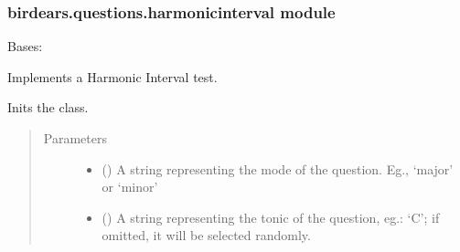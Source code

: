 \documentclass[letterpaper,10pt,english]{sphinxmanual}
\begin{document}
\subsubsection{birdears.questions.harmonicinterval module}
\label{\detokenize{birdears.questions:module-birdears.questions.harmonicinterval}}\label{\detokenize{birdears.questions:birdears-questions-harmonicinterval-module}}

\begin{fulllineitems}
\label{\detokenize{birdears.questions:birdears.questions.harmonicinterval.HarmonicIntervalQuestion}}
Bases: {\hyperref[\detokenize{index:birdears.questionbase.QuestionBase}]{}}

Implements a Harmonic Interval test.

\begin{fulllineitems}
\label{\detokenize{birdears.questions:birdears.questions.harmonicinterval.HarmonicIntervalQuestion.__init__}}
Inits the class.
\begin{quote}\begin{description}
\item[{Parameters}] \leavevmode\begin{itemize}
\item {} 
 () \textendash{} A string representing the mode of the question.
Eg., ‘major’ or ‘minor’

\item {} 
 () \textendash{} A string representing the tonic of the question,
eg.: ‘C’; if omitted, it will be selected randomly.


\end{itemize}
\end{description}
\end{quote}
\end{fulllineitems}
\end{fulllineitems}
\end{document}
